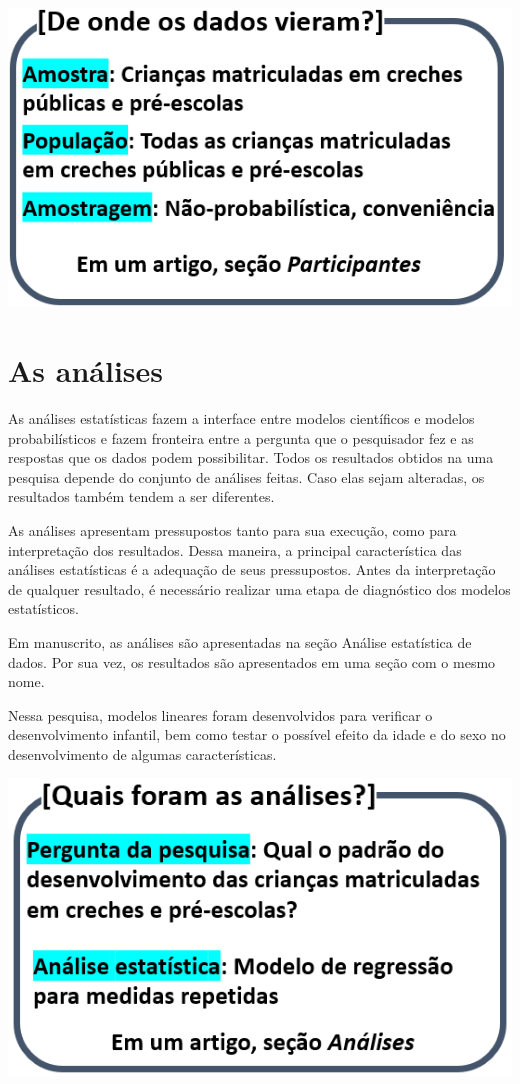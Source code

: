 \documentclass[
]{book}
\begin{document}
\includegraphics{./img/cap_pesquisa_aplicada_onde.png}

\hypertarget{as-anuxe1lises}{%
\section{As análises}\label{as-anuxe1lises}}

As análises estatísticas fazem a interface entre modelos científicos e modelos probabilísticos e fazem fronteira entre a pergunta que o pesquisador fez e as respostas que os dados podem possibilitar. Todos os resultados obtidos na uma pesquisa depende do conjunto de análises feitas. Caso elas sejam alteradas, os resultados também tendem a ser diferentes.

As análises apresentam pressupostos tanto para sua execução, como para interpretação dos resultados. Dessa maneira, a principal característica das análises estatísticas é a adequação de seus pressupostos. Antes da interpretação de qualquer resultado, é necessário realizar uma etapa de diagnóstico dos modelos estatísticos.

Em manuscrito, as análises são apresentadas na seção Análise estatística de dados. Por sua vez, os resultados são apresentados em uma seção com o mesmo nome.

Nessa pesquisa, modelos lineares foram desenvolvidos para verificar o desenvolvimento infantil, bem como testar o possível efeito da idade e do sexo no desenvolvimento de algumas características.

\includegraphics{./img/cap_pesquisa_aplicada_analises.png}
\end{document}

